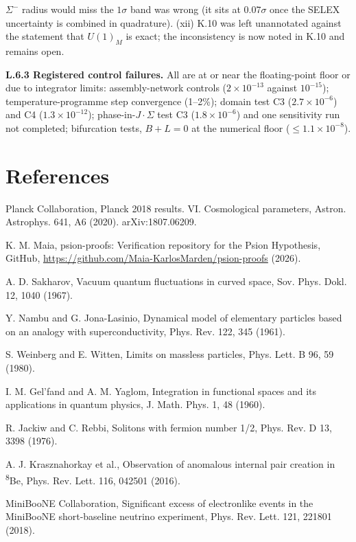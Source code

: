 \documentclass[11pt,letterpaper]{article}
\begin{document}
$\Sigma^-$ radius would miss the $1\sigma$ band was wrong (it sits at $0.07\sigma$ once the SELEX uncertainty is combined in quadrature). (xii) K.10 was left unannotated against the statement that $U(1)_M$ is exact; the inconsistency is now noted in K.10 and remains open.

\noindent \textbf{L.6.3 Registered control failures. }All are at or near the floating-point floor or due to integrator limits: assembly-network controls ($2\times10^{-13}$ against $10^{-15}$); temperature-programme step convergence (1--2\%); domain test C3 ($2.7\times10^{-6}$) and C4 ($1.3\times10^{-12}$); phase-in-$J\!\cdot\!\Sigma$ test C3 ($1.8\times10^{-6}$) and one sensitivity run not completed; bifurcation tests, $B+L=0$ at the numerical floor ($\le1.1\times10^{-8}$).

\section*{References}

\noindent [1] Planck Collaboration, Planck 2018 results. VI. Cosmological parameters, Astron. Astrophys. 641, A6 (2020). arXiv:1807.06209.

\noindent [2] K. M. Maia, psion-proofs: Verification repository for the Psion Hypothesis, GitHub, \url{https://github.com/Maia-KarlosMarden/psion-proofs} (2026).

\noindent [3] A. D. Sakharov, Vacuum quantum fluctuations in curved space, Sov. Phys. Dokl. 12, 1040 (1967).

\noindent [4] Y. Nambu and G. Jona-Lasinio, Dynamical model of elementary particles based on an analogy with superconductivity, Phys. Rev. 122, 345 (1961).

\noindent [5] S. Weinberg and E. Witten, Limits on massless particles, Phys. Lett. B 96, 59 (1980).

\noindent [6] I. M. Gel'fand and A. M. Yaglom, Integration in functional spaces and its applications in quantum physics, J. Math. Phys. 1, 48 (1960).

\noindent [7] R. Jackiw and C. Rebbi, Solitons with fermion number 1/2, Phys. Rev. D 13, 3398 (1976).

\noindent [8] A. J. Krasznahorkay et al., Observation of anomalous internal pair creation in \textsuperscript{8}Be, Phys. Rev. Lett. 116, 042501 (2016).

\noindent [9] MiniBooNE Collaboration, Significant excess of electronlike events in the MiniBooNE short-baseline neutrino experiment, Phys. Rev. Lett. 121, 221801 (2018).
\end{document}
